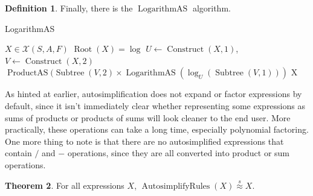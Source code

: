 \documentclass{article}
\theoremstyle{definition}
\newtheorem{thm}{Theorem}[section]
\newtheorem{defin}[thm]{Definition}
\DeclareMathOperator{\arules}{AutosimplifyRules}
\DeclareMathOperator{\sprod}{ProductAS}
\DeclareMathOperator{\slog}{LogarithmAS}
\DeclareMathOperator{\pow}{\wedge}
\DeclareMathOperator{\construct}{Construct}
\DeclareMathOperator{\Root}{Root}
\DeclareMathOperator{\subtree}{Subtree}
\begin{document}
\begin{defin}
    Finally, there is the $\slog$ algorithm.
    
    \begin{algorithm}
    \caption{LogarithmAS}
        \begin{algorithmic}[1]
            \small
            \Require $X \in \mathcal{X}(S, A, F)$ \AND $\Root(X) = \log$
            \State $U \gets \construct(X,1)$, $V \gets \construct(X,2)$
                \State {}
                \State {}
            \ElsIf{$\Root(V) = \pow$}
                \State \Return $\sprod(\subtree(V, 2) \times \slog(\log_U(\subtree(V, 1)))$
            \Else
                \State \Return X
            \EndIf
            \normalsize
        \end{algorithmic}
    \end{algorithm}
\end{defin}

\newpage

As hinted at earlier, autosimplification does not expand or factor expressions by default, since it isn't immediately clear whether representing some expressions as sums of products or products of sums will look cleaner to the end user. More practically, these operations can take a long time, especially polynomial factoring. One more thing to note is that there are no autosimplified expressions that contain $/$ and $-$ operations, since they are all converted into product or sum operations.

\begin{thm}
    For all expressions $X$, $\arules(X) \overset{s}{\approx} X$.
\end{thm}
\end{document}
